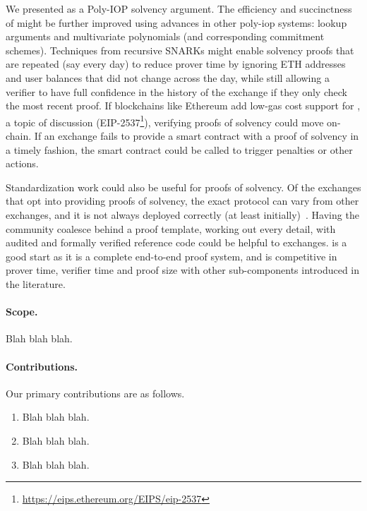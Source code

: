 We presented \Sys as a Poly-IOP solvency argument. The efficiency and succinctness of \Sys might be further improved using advances in other poly-iop systems: lookup arguments and multivariate polynomials (and corresponding commitment schemes). Techniques from recursive SNARKs might enable solvency proofs that are repeated (say every day) to reduce prover time by ignoring ETH addresses and user balances that did not change across the day, while still allowing a verifier to have full confidence in the history of the exchange if they only check the most recent proof. If blockchains like Ethereum add low-gas cost support for \bls, a topic of discussion (EIP-2537\footnote{\url{https://eips.ethereum.org/EIPS/eip-2537}}), verifying proofs of solvency could move on-chain. If an exchange fails to provide a smart contract with a proof of solvency in a timely fashion, the smart contract could be called to trigger penalties or other actions. 

Standardization work could also be useful for proofs of solvency. Of the exchanges that opt into providing proofs of solvency, the exact protocol can vary from other exchanges, and it is not always deployed correctly (at least initially)~\cite{broken}. Having the community coalesce behind a proof template, working out every detail, with audited and formally verified reference code could be helpful to exchanges. \Sys is a good start as it is a complete end-to-end proof system, and is competitive in prover time, verifier time and proof size with other sub-components introduced in the literature.

 

\paragraph{Scope.} 
Blah blah blah.


\paragraph{Contributions.} 
Our primary contributions are as follows.

\begin{enumerate}

\item Blah blah blah.

\item Blah blah blah. 

\item Blah blah blah. 

\end{enumerate}

